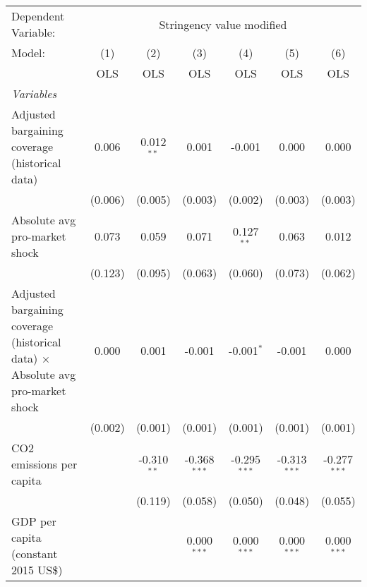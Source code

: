 
\begingroup
\centering
\begin{tabular}{lcccccc}
   \toprule
   Dependent Variable: & \multicolumn{6}{c}{Stringency value modified}\\
   Model:                                                                                 & (1)     & (2)           & (3)            & (4)            & (5)            & (6)\\  
                                                                                          &  OLS    & OLS           & OLS            & OLS            & OLS            & OLS\\  
   \midrule
   \emph{Variables}\\
   Adjusted bargaining coverage (historical data)                                         & 0.006   & 0.012$^{**}$  & 0.001          & -0.001         & 0.000          & 0.000\\   
                                                                                          & (0.006) & (0.005)       & (0.003)        & (0.002)        & (0.003)        & (0.003)\\   
   Absolute avg pro-market shock                                                          & 0.073   & 0.059         & 0.071          & 0.127$^{**}$   & 0.063          & 0.012\\   
                                                                                          & (0.123) & (0.095)       & (0.063)        & (0.060)        & (0.073)        & (0.062)\\   
   Adjusted bargaining coverage (historical data) $\times$ Absolute avg pro-market shock  & 0.000   & 0.001         & -0.001         & -0.001$^{*}$   & -0.001         & 0.000\\   
                                                                                          & (0.002) & (0.001)       & (0.001)        & (0.001)        & (0.001)        & (0.001)\\   
   CO2 emissions per capita                                                               &         & -0.310$^{**}$ & -0.368$^{***}$ & -0.295$^{***}$ & -0.313$^{***}$ & -0.277$^{***}$\\   
                                                                                          &         & (0.119)       & (0.058)        & (0.050)        & (0.048)        & (0.055)\\   
   GDP per capita (constant 2015 US\$)                                                    &         &               & 0.000$^{***}$  & 0.000$^{***}$  & 0.000$^{***}$  & 0.000$^{***}$\\   

\end{tabular}
